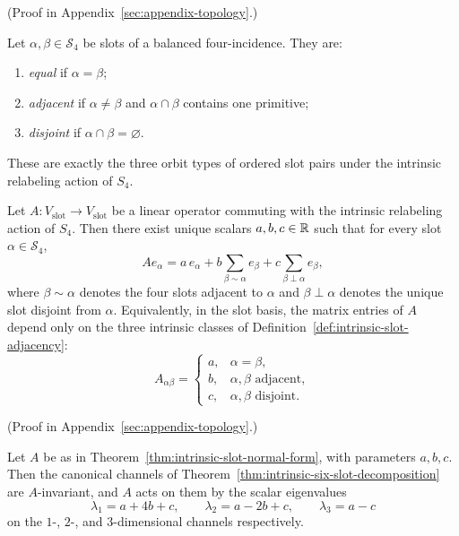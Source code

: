 (Proof in Appendix~\ref{sec:appendix-topology}.)

\begin{definition}
\label{def:intrinsic-slot-adjacency}
Let $\alpha,\beta\in\mathcal S_4$ be slots of a balanced four-incidence.
They are:
\begin{enumerate}[label=(\roman*), itemsep=0.2em]
\item \emph{equal} if $\alpha=\beta$;
\item \emph{adjacent} if $\alpha\neq\beta$ and $\alpha\cap\beta$ contains one
      primitive;
\item \emph{disjoint} if $\alpha\cap\beta=\varnothing$.
\end{enumerate}
These are exactly the three orbit types of ordered slot pairs under the
intrinsic relabeling action of $S_4$.
\end{definition}

\begin{theorem}
\label{thm:intrinsic-slot-normal-form}
Let $A:V_{\mathrm{slot}}\to V_{\mathrm{slot}}$ be a linear operator commuting
with the intrinsic relabeling action of $S_4$. Then there exist unique scalars
$a,b,c\in\mathbb{R}$ such that for every slot $\alpha\in\mathcal S_4$,
\[
A e_\alpha
=
a\,e_\alpha
+
b\sum_{\beta\sim\alpha} e_\beta
+
c\sum_{\beta\perp\alpha} e_\beta,
\]
where $\beta\sim\alpha$ denotes the four slots adjacent to $\alpha$ and
$\beta\perp\alpha$ denotes the unique slot disjoint from $\alpha$.
Equivalently, in the slot basis, the matrix entries of $A$ depend only on the
three intrinsic classes of Definition~\ref{def:intrinsic-slot-adjacency}:
\[
A_{\alpha\beta}=
\begin{cases}
a,& \alpha=\beta,\\
b,& \alpha,\beta\text{ adjacent},\\
c,& \alpha,\beta\text{ disjoint}.
\end{cases}
\]
\end{theorem}

(Proof in Appendix~\ref{sec:appendix-topology}.)

\begin{corollary}
\label{cor:intrinsic-channel-eigenvalues}
Let $A$ be as in Theorem~\ref{thm:intrinsic-slot-normal-form}, with parameters
$a,b,c$. Then the canonical channels of
Theorem~\ref{thm:intrinsic-six-slot-decomposition} are $A$-invariant, and $A$
acts on them by the scalar eigenvalues
\[
\lambda_1=a+4b+c,\qquad
\lambda_2=a-2b+c,\qquad
\lambda_3=a-c
\]
on the $1$-, $2$-, and $3$-dimensional channels respectively.
\end{corollary}


